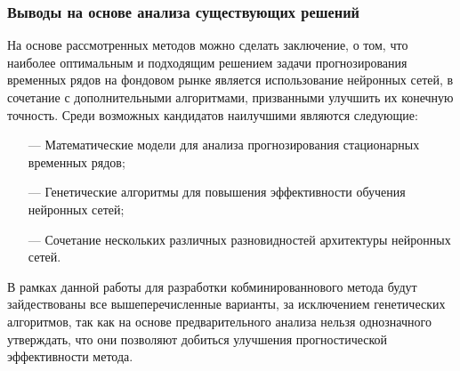 \subsubsection{Выводы на основе анализа существующих решений}

\par На основе рассмотренных методов можно сделать заключение, о том, что наиболее оптимальным и подходящим решением задачи прогнозирования временных рядов на фондовом рынке является использование нейронных сетей, в сочетание с дополнительными алгоритмами, призванными улучшить их конечную точность. Среди возможных кандидатов наилучшими являются следующие:

\begin{itemize}[leftmargin=1.6\parindent]
    \item[---] Математические модели для анализа прогнозирования стационарных временных рядов;
	\item[---] Генетические алгоритмы для повышения эффективности обучения нейронных сетей;
	\item[---] Сочетание нескольких различных разновидностей архитектуры нейронных сетей.
\end{itemize}

\par В рамках данной работы для разработки кобминированнового метода будут зайдествованы все вышеперечисленные варианты, за исключением генетических алгоритмов, так как на основе предварительного анализа нельзя однозначного утверждать, что они позволяют добиться улучшения прогностической эффективности метода.\cite{genetic, genetic-2}
\pagebreak